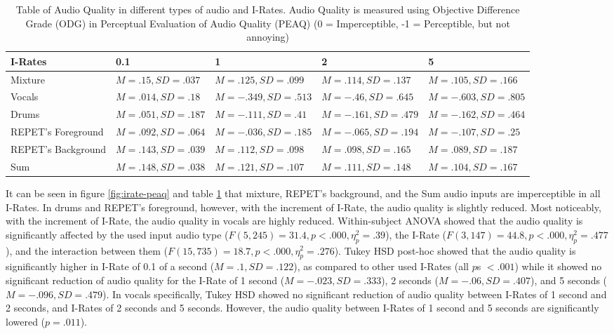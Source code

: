 \begin{table}[ht]
\centering
\begin{tabularx}{\linewidth}{|X|X|X|X|X|}
\hline
I-Rates & 0.1 & 1 & 2 & 5 \\
\hline
Mixture & $M=.15, SD=.037$ & $M=.125, SD=.099$ & $M=.114, SD=.137$ & $M=.105, SD=.166$ \\
\hline
Vocals & $M=.014, SD=.18$ & $M=-.349, SD=.513$ & $M=-.46, SD=.645$ & $M=-.603, SD=.805$ \\
\hline
Drums & $M=.051, SD=.187$ & $M=-.111, SD=.41$ & $M=-.161, SD=.479$ & $M=-.162, SD=.464$ \\
\hline
REPET's Foreground & $M=.092, SD=.064$ & $M=-.036, SD=.185$ & $M=-.065, SD=.194$ & $M=-.107, SD=.25$ \\
\hline
REPET's Background & $M=.143, SD=.039$ & $M=.112, SD=.098$ & $M=.098, SD=.165$ & $M=.089, SD=.187$ \\
\hline
Sum & $M=.148, SD=.038$ & $M=.121, SD=.107$ & $M=.111, SD=.148$ & $M=.104, SD=.167$ \\
\hline
\end{tabularx}
\caption[Table of Audio Quality in different types of audio and I-Rates.]{Table of Audio Quality in different types of audio and I-Rates. Audio Quality is measured using Objective Difference Grade (ODG) in Perceptual Evaluation of Audio Quality (PEAQ) (0 = Imperceptible, -1 = Perceptible, but not annoying)}
\label{tab:irate-peaq}
\end{table}

It can be seen in figure \ref{fig:irate-peaq} and table \ref{tab:irate-peaq} that mixture, REPET's background, and the Sum audio inputs are imperceptible in all I-Rates.
In drums and REPET's foreground, however, with the increment of I-Rate, the audio quality is slightly reduced.
Most noticeably, with the increment of I-Rate, the audio quality in vocals are highly reduced.
Within-subject ANOVA showed that the audio quality is significantly affected by the used input audio type ($F(5,245)=31.4, p<.000, \eta_{p}^{2}=.39$), the I-Rate ($F(3,147)=44.8, p<.000, \eta_{p}^{2}=.477$), and the interaction between them ($F(15,735)=18.7, p<.000, \eta_{p}^{2}=.276$).
Tukey HSD post-hoc showed that the audio quality is significantly higher in I-Rate of 0.1 of a second ($M=.1, SD=.122$), as compared to other used I-Rates (all $p$s $<.001$) while it showed no significant reduction of audio quality for the I-Rate of 1 second ($M=-.023, SD=.333$), 2 seconds ($M=-.06, SD=.407$), and 5 seconds ($M=-.096, SD=.479$). In vocals specifically, Tukey HSD showed no significant reduction of audio quality between I-Rates of 1 second and 2 seconds, and I-Rates of 2 seconds and 5 seconds. However, the audio quality between I-Rates of 1 second and 5 seconds are significantly lowered ($p=.011$).

